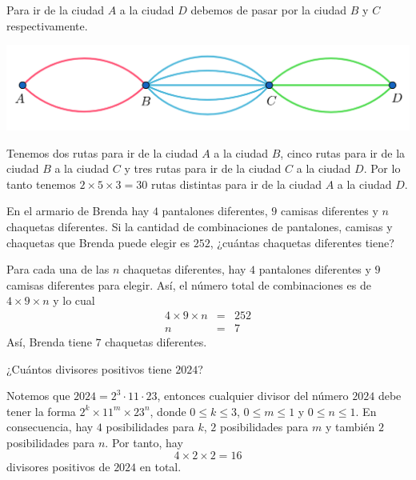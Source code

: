 \begin{ejemplo}
    Para ir de la ciudad $A$ a la ciudad $D$ debemos de pasar por la ciudad $B$ y $C$ respectivamente.

    \begin{center}
        \includegraphics[scale=0.3]{Imagenes/IMG1/S1-1-07.png}
    \end{center}

    Tenemos dos rutas para ir de la ciudad $A$ a la ciudad $B$, cinco rutas para ir de la ciudad $B$ a la ciudad $C$ y tres rutas para ir de la ciudad $C$ a la ciudad $D$. Por lo tanto tenemos $2 \times 5 \times 3=30$ rutas distintas para ir de la ciudad $A$ a la ciudad $D$.
\end{ejemplo}

\begin{solucion}
    
\end{solucion}

\begin{ejemplo}
    En el armario de Brenda hay $4$ pantalones diferentes, $9$ camisas diferentes y $n$ chaquetas diferentes. Si la cantidad de combinaciones de pantalones, camisas y chaquetas que Brenda puede elegir es $252$, ¿cuántas chaquetas diferentes tiene?
\end{ejemplo}

\begin{solucion}
    Para cada una de las $n$ chaquetas diferentes, hay $4$ pantalones diferentes y $9$ camisas diferentes para elegir. Así, el número total de combinaciones es de $4\times 9 \times n$ y lo cual
    \begin{eqnarray*}
        4\times 9 \times n&=&252\\
        n&=&7
    \end{eqnarray*}
    Así, Brenda tiene $7$ chaquetas diferentes.
\end{solucion}

\begin{ejemplo}
    ¿Cuántos divisores positivos tiene $2024$?
\end{ejemplo}

\begin{solucion}
    Notemos que $2024=2^3\cdot 11 \cdot 23$, entonces cualquier divisor del número $2024$ debe tener la forma $2^k\times 11^m \times 23^n$, donde $0\leq k\leq 3$, $0\leq m\leq 1$ y $0\leq n\leq 1$. En consecuencia, hay $4$ posibilidades para $k$, $2$ posibilidades para $m$ y también $2$ posibilidades para $n$. Por tanto, hay
    \[4\times 2 \times 2=16\]
    divisores positivos de $2024$ en total.
\end{solucion}

